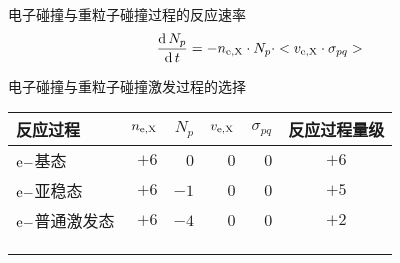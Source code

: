 \begin{frame}{电子碰撞与重粒子碰撞过程的反应速率}
	$$
	\frac{{\rm d}\,N_p}{{\rm d}\,t}=-n_{\rm e,X}\cdot N_p\cdot <v_{\rm e,X}\cdot\sigma_{pq}>
	$$
\end{frame}

\begin{frame}{电子碰撞与重粒子碰撞激发过程的选择}
\centering
\begin{table}%
\begin{center}
\begin{tabular}{lrrrrc}\toprule[1.5pt]
反应过程 & $n_{\rm e,X}$ & $N_{p}$ & $v_{\rm e,X}$ & $\sigma_{pq}$ & 反应过程量级\\
\midrule[1pt]
${\rm e-}$基态       & $+6$ & $0$  & $0$  & $0$  & $+6$ \\
${\rm e-}$亚稳态     & $+6$ & $-1$ & $0$  & $0$  & $+5$ \\
${\rm e-}$普通激发态 & $+6$ & $-4$ & $0$  & $0$  & $+2$ \\
\color{gray}{${\rm X-}$基态} & \color{gray}{$+4$} & \color{gray}{$0$}  & \color{gray}{$-3$} & \color{gray}{$-3$} & \color{gray}{$-2$} \\
\color{gray}{${\rm X-}$亚稳态}     & \color{gray}{$+4$} & \color{gray}{$-1$} & \color{gray}{$-3$} & \color{gray}{$-3$} & \color{gray}{$-3$} \\
\color{gray}{${\rm X-}$普通激发态} & \color{gray}{$+4$} & \color{gray}{$-4$} & \color{gray}{$-3$} & \color{gray}{$-3$} & \color{gray}{$-6$} \\
\bottomrule[1.5pt]
\end{tabular}
\end{center}
\end{table}
\end{frame}

